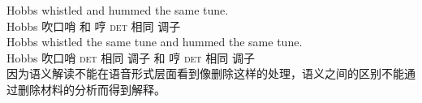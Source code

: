 \eal
\ex\label{ex-whistled-a} 
\gll Hobbs whistled and hummed the same tune.\\
Hobbs 吹口哨 和 哼 \textsc{det} 相同 调子\\
\ex\label{ex-whistled-b} 
\gll Hobbs whistled the same tune and hummed the same tune.\\
Hobbs 吹口哨 \textsc{det} 相同 调子 和 哼 \textsc{det} 相同 调子\\
\zl
因为语义解读不能在语音形式层面看到像删除这样的处理\citep[\S~3]{Chomsky95a-u}，语义之间的区别不能通过删除材料的分析而得到解释。

